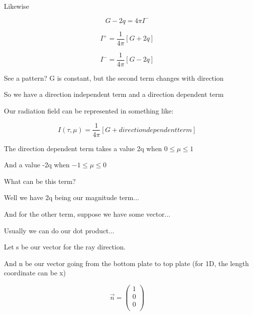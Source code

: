 \documentclass[12pt]{article}
\renewcommand{\_}{\kern-1.5pt\textunderscore\kern-1.5pt}
\begin{document}
\begin{itemize}
Likewise\par

 \[ G-2q=4 \pi I^{-} \] \par

 \[ I^{+}=\frac{1}{4 \pi } \left[ G+2q \right]  \] \par

 \[ I^{-}=\frac{1}{4 \pi } \left[ G-2q \right]  \] \par

See a pattern? G is constant, but the second term changes with direction\par

So we have a direction independent term and a direction dependent term\par

Our radiation field can be represented in something like:\par

 \[ I \left(  \tau, \mu  \right) =\frac{1}{4 \pi } \left[ G+direction dependent term \right]  \] \par

The direction dependent term takes a value 2q when  \( 0 \leq  \mu  \leq 1 \) \par

And a value -2q when  \( -1 \leq  \mu  \leq 0 \) \par

What can be this term?\par

Well we have 2q being our magnitude term$ \ldots $ \par

And for the other term, suppose we have some vector$ \ldots $ \par

Usually we can do our dot product$ \ldots $ \par

Let s be our vector for the ray direction.\par

And n be our vector going from the bottom plate to top plate (for 1D, the length coordinate can be x)\par

 \[ \overrightarrow{n}= \left( \begin{array}{c}
	1\\
	0\\
	0\\
	\end{array} \right)  \] \par



\end{itemize}
\end{document}

